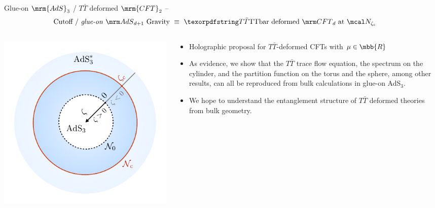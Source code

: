 \documentclass[
	10pt
	,handout
	,noamsthm
]{beamer}
\newcommand{\TTbar}{\texorpdfstring{\ensuremath{T\bar{T}}}{TTbar}\xspace}
\begin{document}
\begin{frame}{Glue-on $\mrm{AdS}_3$ / \TTbar deformed $\mrm{CFT}_2$}{%
	\textcite{Apolo:2023vnm} -- 
}
\vspace{-1.2\baselineskip}
\begin{equation}
\stateGlueon
\end{equation}
\vspace{-.3\baselineskip}
\begin{columns}
\begin{column}{.3\textwidth}
\centering
\includegraphics[width=\linewidth]{img/diagram.pdf}
\end{column}
\hspace{-1em}
\begin{column}{.7\textwidth}
\begin{itemize}
\item Holographic proposal for $T\bar T$-deformed CFTs with $\mu \in \mbb{R}$

\item As evidence, we show that the $T\bar T$ trace flow equation, the spectrum on the cylinder, and the partition function on the torus and the sphere, among other results, can all be reproduced from bulk calculations in glue-on AdS$_3$.

\pause
\item We hope to understand the entanglement structure of \TTbar deformed theories from bulk geometry.
\end{itemize}
\end{column}
\end{columns}
\end{frame}
\end{document}
